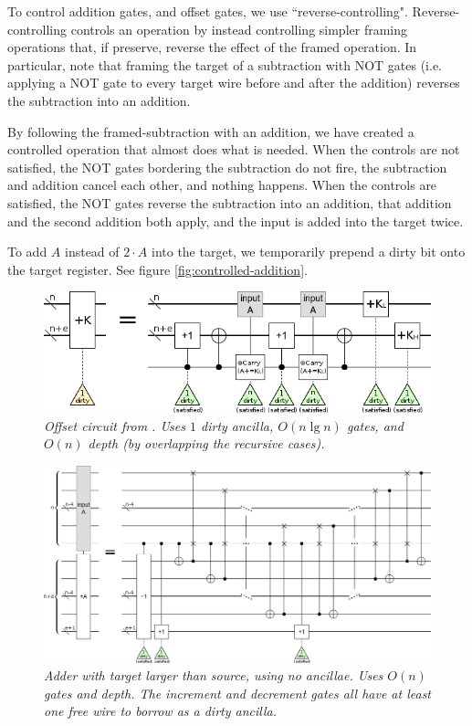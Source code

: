 \documentclass[twocolumn]{article}
\begin{document}
To control addition gates, and offset gates, we use ``reverse-controlling".
Reverse-controlling controls an operation by instead controlling simpler framing operations that, if preserve, reverse the effect of the framed operation.
In particular, note that framing the target of a subtraction with NOT gates (i.e. applying a NOT gate to every target wire before and after the addition) reverses the subtraction into an addition.

By following the framed-subtraction with an addition, we have created a controlled operation that almost does what is needed.
When the controls are not satisfied, the NOT gates bordering the subtraction do not fire, the subtraction and addition cancel each other, and nothing happens.
When the controls are satisfied, the NOT gates reverse the subtraction into an addition, that addition and the second addition both apply, and the input is added into the target twice.

To add $A$ instead of $2 \cdot A$ into the target, we temporarily prepend a dirty bit onto the target register.
See figure \ref{fig:controlled-addition}.

\begin{figure}
  \centering
  \includegraphics[width=\linewidth]{assets/offset.png}
  \caption{\em
      Offset circuit from \cite{haner2016}.
      Uses $1$ dirty ancilla, $O(n \lg n)$ gates, and $O(n)$ depth (by overlapping the recursive cases).
  }
  \label{fig:offset}
\end{figure}

\begin{figure}
  \centering
  \includegraphics[width=\linewidth]{assets/inline-adder-into-large.png}
  \caption{\em
      Adder with target larger than source, using no ancillae.
      Uses $O(n)$ gates and depth.
      The increment and decrement gates all have at least one free wire to borrow as a dirty ancilla.
  }
  \label{fig:inline-adder-into-large}
\end{figure}
\end{document}

